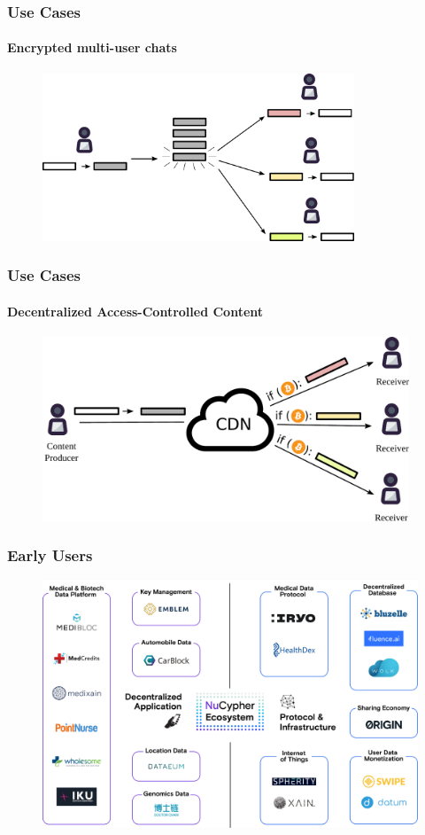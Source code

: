 \documentclass[xetex,mathsans,sans,aspectratio=169]{beamer}
\begin{document}
    \begin{frame}
        \frametitle{Use Cases}
        \framesubtitle{Encrypted multi-user chats}
        \begin{figure}
            \centering
            \includegraphics[height=5cm]{pdf/chats.pdf}
        \end{figure}
    \end{frame}

    \begin{frame}
        \frametitle{Use Cases}
        \framesubtitle{Decentralized Access-Controlled Content}
        \begin{figure}
            \centering
            \includegraphics[height=5.5cm]{pdf/content.pdf}
        \end{figure}
    \end{frame}

    \begin{frame}
      \frametitle{Early Users}
      \begin{figure}
           \includegraphics[width=11.5cm]{pdf/projects.pdf}
      \end{figure}
    \end{frame}
\end{document}
